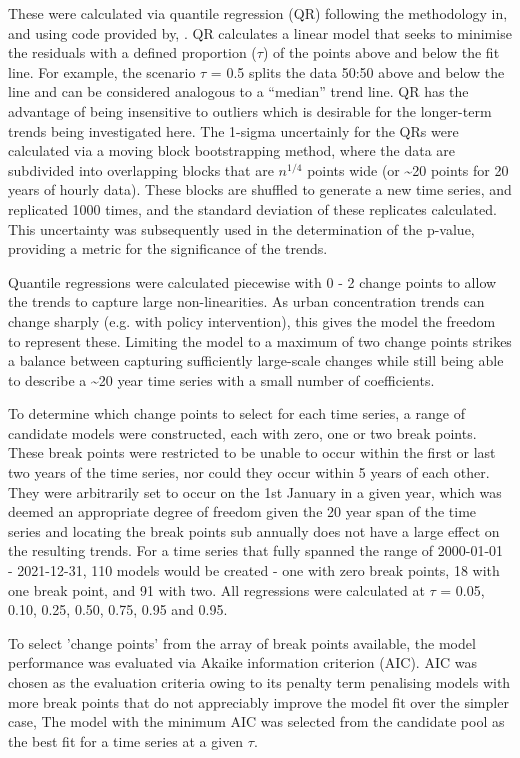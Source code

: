 \documentclass[journal abbreviation, manuscript]{copernicus}
\begin{document}
These were calculated via quantile regression (QR) following the methodology in, and using code provided by, \cite{chang2023guidancenotebeststatistical}. QR calculates a linear model that seeks to minimise the residuals with a defined proportion ($\tau$) of the points above and below the fit line. For example, the scenario $\tau$ = 0.5 splits the data 50:50 above and below the line and can be considered analogous to a “median” trend line. QR has the advantage of being insensitive to outliers which is desirable for the longer-term trends being investigated here. The 1-sigma uncertainly for the QRs were calculated via a moving block bootstrapping method, where the data are subdivided into overlapping blocks that are $n^{1/4}$ points wide (or \textasciitilde{20} points for 20 years of hourly data). These blocks are shuffled to generate a new time series, and replicated 1000 times, and the standard deviation of these replicates calculated. This uncertainty was subsequently used in the determination of the p-value, providing a metric for the significance of the trends. 

Quantile regressions were calculated piecewise with 0 - 2 change points to allow the trends to capture large non-linearities. As urban concentration trends can change sharply (e.g. with policy intervention), this gives the model the freedom to represent these. Limiting the model to a maximum of two change points strikes a balance between capturing sufficiently large-scale changes while still being able to describe a \textasciitilde{20} year time series with a small number of coefficients.

To determine which change points to select for each time series, a range of candidate models were constructed, each with zero, one or two break points. These break points were restricted to be unable to occur within the first or last two years of the time series, nor could they occur within 5 years of each other. They were arbitrarily set to occur on the 1st January in a given year, which was deemed an appropriate degree of freedom given the 20 year span of the time series and locating the break points sub annually does not have a large effect on the resulting trends. For a time series that fully spanned the range of 2000-01-01 - 2021-12-31, 110 models would be created - one with zero break points, 18 with one break point, and 91 with two. All regressions were calculated at $\tau$ = 0.05, 0.10, 0.25, 0.50, 0.75, 0.95 and 0.95.

To select 'change points' from the array of break points available, the model performance was evaluated via Akaike information criterion (AIC). AIC was chosen as the evaluation criteria owing to its penalty term penalising models with more break points that do not appreciably improve the model fit over the simpler case, The model with the minimum AIC was selected from the candidate pool as the best fit for a time series at a given $\tau$. 
\end{document}
